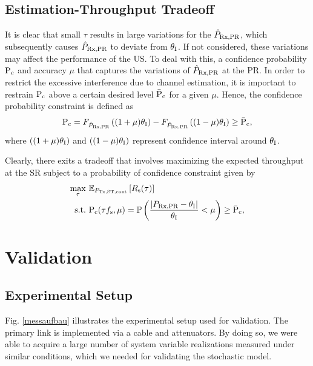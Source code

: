 \subsection{Estimation-Throughput Tradeoff}
It is clear that small $\tau$ results in large variations for the $\hat{P}_{\text{Rx,PR}}$, which subsequently causes $\hat{P}_{\text{Rx,PR}}$ to deviate from $\theta_{\text{I}}$. If not considered, these variations may affect the performance of the US. To deal with this, a confidence probability $\text{P}_{\text{c}}$ and accuracy $\mu$ that captures the variations of $\hat{P}_{\text{Rx,PR}}$ at the PR. In order to restrict the excessive interference due to channel estimation, it is important to restrain $\text{P}_{\text{c}}$ above a certain desired level $\bar{\text{P}}_{\text{c}}$ for a given $\mu$. Hence, the confidence probability constraint is defined as
\begin{align}
\text{P}_{\text{c}} = F_{\hat{P}_{\text{Rx,PR}}} \left( {(1 + \mu) \theta_{\text{I}}}\right)  - F_{\hat{P}_{\text{Rx,PR}}} \left({(1 - \mu) \theta_{\text{I}}} \right) \ge \bar{\text{P}}_{\text{c}}, \label{eq:pc} 
\end{align}
where $\left( {(1 + \mu) \theta_{\text{I}}}\right)$ and $\left({(1 - \mu) \theta_{\text{I}}} \right)$ represent confidence interval around $\theta_{\text{I}}$.

Clearly, there exits a tradeoff that involves maximizing the expected throughput at the SR subject to a probability of confidence constraint given by
\begin{align}
\operatorname*{max}_{\tau}  & \text{      } {\mathbb E}_{P_{\text{Tx,ST,cont}}}\left[ R_{\text{s}}(\tau) \right] 
 \label{eq:sys} \\
\text{s.t.} & \text{ } \text{P}_{\text{c}}(\tau f_{\text{s}}, \mu) = \mathbb P \left( \frac{\left| P_{\text{Rx,PR}} - \theta_{\text{I}} \right|}{\theta_{\text{I}}} < \mu \right) \ge \bar{\text{P}}_{\text{c}}, \nonumber  
\end{align}



\section{Validation}
\label{ssec:val}

\subsection{Experimental Setup}

Fig. \ref{messaufbau} illustrates the experimental setup used for validation. The primary link is implemented via a cable and attenuators. By doing so, we were able to acquire a large number of system variable realizations measured under similar conditions, which we needed for validating the stochastic model. 


